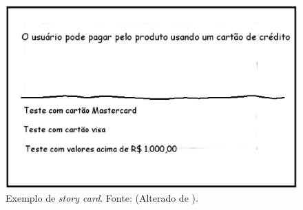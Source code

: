 \begin{figure}[ht]
	\centering
	\includegraphics[width=15 cm]{figuras/story_card.eps}
	\caption{Exemplo de \emph{story card}. Fonte: (Alterado de ).}
    	\label{story_card}
\end{figure}


